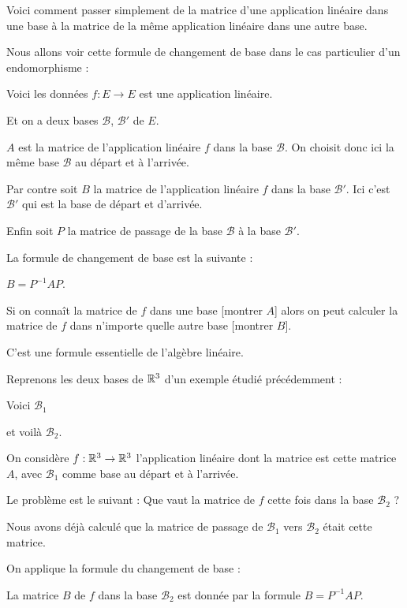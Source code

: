Voici comment passer simplement de la matrice d'une application linéaire dans une base à la matrice de la même application linéaire dans une autre base.

\change
Nous allons voir cette formule de changement de base dans 
le cas particulier d'un endomorphisme :

Voici les données $f : E \to E$ est une application linéaire.  

\change
Et on a deux bases $\mathcal{B}$, $\mathcal{B}'$ de $E$.

\change 
$A$ est la matrice de l'application linéaire $f$ dans la base 
  $\mathcal{B}$. On choisit donc ici la même base $\mathcal{B}$ au départ et à l'arrivée.
  
\change
Par contre soit $B$ la matrice de l'application linéaire $f$ dans
  la base $\mathcal{B}'$. Ici c'est $\mathcal{B}'$ qui est la base 
  de départ et d'arrivée.
  
  
\change
Enfin soit $P$ la matrice de passage de la base $\mathcal{B}$ à la base $\mathcal{B}'$.
  
\change
La formule de changement de base est la suivante :

$B = P^{-1} A P$.

Si on connaît la matrice de $f$ dans une base [montrer $A$]
alors on peut calculer la matrice de $f$ dans n'importe quelle autre base [montrer $B$].

C'est une formule essentielle de l'algèbre linéaire.



\diapo

\change
Reprenons les deux bases de $\mathbb{R}^3$ d'un exemple étudié précédemment :

Voici $\mathcal{B}_1$

et voilà $\mathcal{B}_2$.

On considère  $f : \mathbb{R}^3 \to \mathbb{R}^3$ l'application linéaire dont
la matrice  est cette matrice $A$,
avec $\mathcal{B}_1$ comme base au départ et à l'arrivée.

\change
Le problème est le suivant : 
Que vaut la matrice de $f$ cette fois dans la base $\mathcal{B}_2$ ?

\change
Nous avons déjà calculé que la matrice de passage de $\mathcal{B}_1$ vers $\mathcal{B}_2$ 
était cette matrice.

\change
On applique la formule du changement de base :

\change
La matrice $B$ de $f$ dans la base $\mathcal{B}_2$ 
est donnée par la formule 
$B = P^{-1} A P$.

